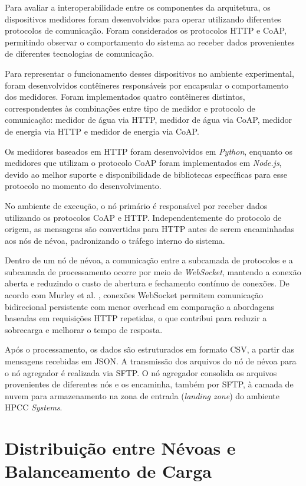 Para avaliar a interoperabilidade entre os componentes da arquitetura, os
dispositivos medidores foram desenvolvidos para operar utilizando diferentes
protocolos de comunicação. Foram considerados os protocolos HTTP e CoAP,
permitindo observar o comportamento do sistema ao receber dados provenientes
de diferentes tecnologias de comunicação.

Para representar o funcionamento desses dispositivos no ambiente experimental,
foram desenvolvidos contêineres responsáveis por encapsular o comportamento dos
medidores. Foram implementados quatro contêineres distintos, correspondentes
às combinações entre tipo de medidor e protocolo de comunicação: medidor de
água via HTTP, medidor de água via CoAP, medidor de energia via HTTP e medidor
de energia via CoAP.

Os medidores baseados em \gls{HTTP} foram desenvolvidos em \textit{Python}, enquanto os medidores que utilizam o protocolo \gls{CoAP} foram implementados em \textit{Node.js}, devido ao melhor suporte e disponibilidade de bibliotecas específicas para esse protocolo no momento do desenvolvimento.

No ambiente de execução, o nó primário é responsável por receber dados utilizando os protocolos \gls{CoAP} e \gls{HTTP}. Independentemente do protocolo de origem, as mensagens são convertidas para \gls{HTTP} antes de serem encaminhadas aos nós de névoa, padronizando o tráfego interno do sistema.

Dentro de um nó de névoa, a comunicação entre a subcamada de protocolos e a subcamada de processamento ocorre por meio de \textit{WebSocket}, mantendo a conexão aberta e reduzindo o custo de abertura e fechamento contínuo de conexões. De acordo com Murley et al. \cite{murley2021}, conexões WebSocket permitem comunicação bidirecional persistente com menor overhead em comparação a abordagens baseadas em requisições HTTP repetidas, o que contribui para reduzir a sobrecarga e melhorar o tempo de resposta.

Após o processamento, os dados são estruturados em formato \gls{CSV}, a partir das mensagens recebidas em \gls{JSON}. A transmissão dos arquivos do nó de névoa para o nó agregador é realizada via \gls{SFTP}. O nó agregador consolida os arquivos provenientes de diferentes nós e os encaminha, também por \gls{SFTP}, à camada de nuvem para armazenamento na zona de entrada (\textit{landing zone}) do ambiente \gls{HPCC} \textit{Systems}.

\section{Distribuição entre Névoas e Balanceamento de Carga}

